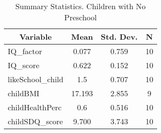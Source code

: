 
\begin{table}[htbp]\centering \caption{Summary Statistics. Children with No Preschool \label{schoolChildmaternaNone}}
\begin{tabular}{l c c  c}\hline\hline
\multicolumn{1}{c}{\textbf{Variable}} & \textbf{Mean}
 & \textbf{Std. Dev.} & \textbf{N}\\ \hline
IQ\_factor & 0.077 & 0.759  & 10\\
IQ\_score & 0.622 & 0.152  & 10\\
likeSchool\_child & 1.5 & 0.707  & 10\\
childBMI & 17.193 & 2.855  & 9\\
childHealthPerc & 0.6 & 0.516  & 10\\
childSDQ\_score & 9.700 & 3.743  & 10\\
\hline\end{tabular}
\end{table}
